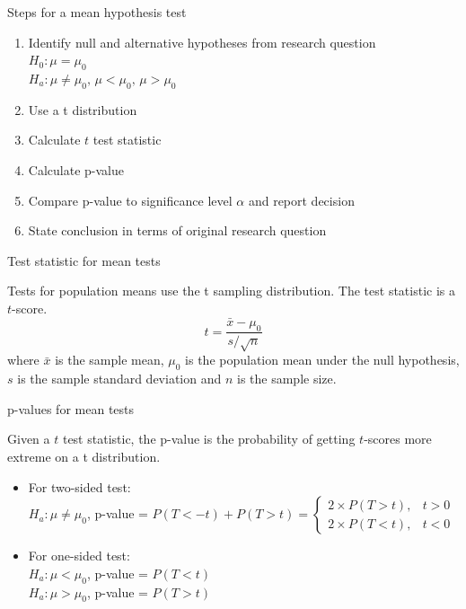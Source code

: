 \documentclass[xcolor=table, aspectratio=169, bigger, handout]{beamer}
\begin{document}
\begin{frame}{Steps for a mean hypothesis test}
\begin{block}{}
\begin{enumerate}
\item Identify null and alternative hypotheses from research question\\
$H_0: \mu = \mu_0$\\
$H_a: \mu \ne \mu_0, \, \mu < \mu_0, \, \mu> \mu_0$
\item Use a t distribution
\item Calculate $t$ test statistic
\item Calculate p-value
\item Compare p-value to significance level $\alpha$ and report decision
\item State conclusion in terms of original research question
\end{enumerate}
\end{block}
\end{frame}


\begin{frame}{Test statistic for mean tests}
\begin{block}{}
Tests for population means use the t sampling distribution. The test statistic is a $t$-score.
\[t = \frac {\bar x - \mu_0}{s/\sqrt{n}}\]
where $\bar x$ is the sample mean, $\mu_0$ is the population mean under the null hypothesis, $s$ is the sample standard deviation and $n$ is the sample size.
\end{block}

\end{frame}


\begin{frame}{p-values for mean tests}
\begin{block}{}
Given a $t$ test statistic, the p-value is the probability of getting $t$-scores more extreme on a t distribution.
\begin{itemize}
\pause\item For two-sided test:\\ 
$H_a: \mu \ne \mu_0$, p-value = $P(T<-t) + P(T > t) = \begin{cases}2 \times P(T > t), & t >0 \\ 2 \times P(T<t), & t < 0\end{cases}$
\pause\item For one-sided test:\\
$H_a: \mu < \mu_0$, p-value = $P(T < t)$\\
$H_a: \mu > \mu_0$, p-value = $P(T > t)$
\end{itemize}
\end{block}
\end{frame}
\end{document}
